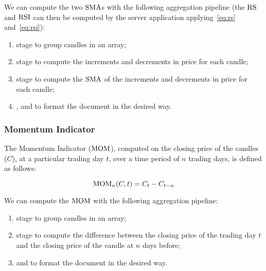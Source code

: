 We can compute the two \(\operatorname{SMA}\)s with the following aggregation pipeline (the
\(\operatorname{RS}\) and \(\operatorname{RSI}\) can then be computed by the server application
applying~\eqref{eq:rs} and~\eqref{eq:rsi}):

\begin{enumerate}
	\item {} stage to group candles in an array;
	\item {} stage to compute the increments and decrements
		in price for each candle;
	\item {} stage to compute the \(\operatorname{SMA}\) of the increments
		and decrements in price for each candle;
	\item {},  and  to
		format the document in the desired way.
\end{enumerate}

\subsubsection{Momentum Indicator}

The Momentum Indicator (\(\operatorname{MOM}\)), computed on the closing price of the candles
(\(C\)), at a particular trading day \(t\), over a time period of \(n\) trading
days, is defined as follows:

\begin{equation}\label{eq:mom}
	\operatorname{MOM}_n(C,t) = C_t - C_{t-n}
\end{equation}

We can compute the \(\operatorname{MOM}\) with the following aggregation pipeline:

\begin{enumerate}
	\item {} stage to group candles in an array;
	\item {} stage to compute the difference between the
		closing price of the trading day \(t\) and the closing price of
		the candle at \(n\) days before;
	\item {} and  to format the document
		in the desired way.
\end{enumerate}
